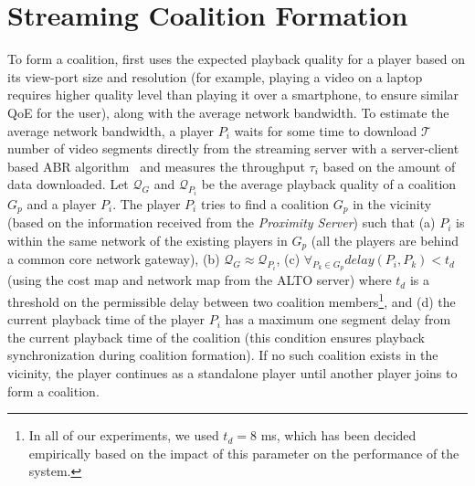 \section{Streaming Coalition Formation}
\label{sec:chap06:coalitionformation}
To form a coalition, {\our} first uses the expected playback quality for a player based on its view-port size and resolution (for example, playing a video on a laptop requires higher quality level than playing it over a smartphone, to ensure similar \ac{QoE} for the user), along with the average network bandwidth. To estimate the average network bandwidth, a player $P_i$ waits for some time to download $\mathcal{T}$ number of video segments directly from the streaming server with a server-client based ABR algorithm~\cite{Spiteri2016,yin2015control,mao2017neural} and measures the throughput $\tau_i$ based on the amount of data downloaded.
Let $\mathcal{Q}_G$ and $\mathcal{Q}_{P_i}$ be the average playback quality of a coalition $G_p$ and a player $P_i$. The player $P_i$ tries to find a coalition $G_p$ in the vicinity (based on the information received from the \textit{Proximity Server}) such that (a) $P_i$ is within the same network of the existing players in $G_p$ (all the players are behind a common core network gateway), (b) $\mathcal{Q}_G \approx \mathcal{Q}_{P_i}$, (c) $\forall_{P_k \in G_p} delay(P_i, P_k) < t_d$ (using the cost map and network map from the \ac{ALTO} server) where $t_d$ is a threshold on the permissible delay between two coalition members\footnote{In all of our experiments, we used $t_d=$8 ms, which has been decided empirically based on the impact of this parameter on the performance of the system.}, and (d) the current playback time of the player $P_i$ has a maximum one segment delay from the current playback time of the coalition (this condition ensures playback synchronization during coalition formation). If no such coalition exists in the vicinity, the player continues as a standalone player until another player joins to form a coalition. 
%

